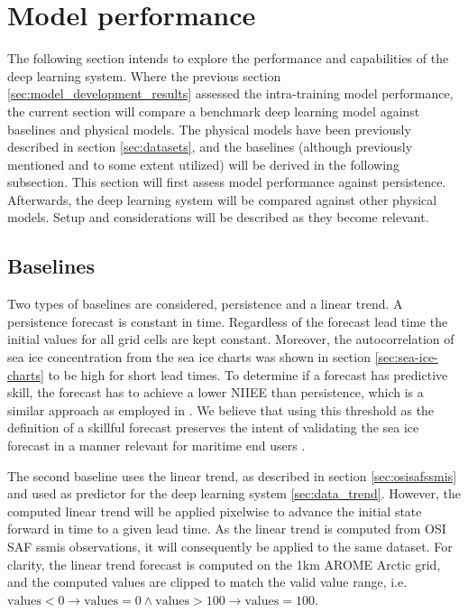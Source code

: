\documentclass[../main/thesis.tex]{subfiles}
\begin{document}
\section{Model performance}
\label{sec:model-perf}
The following section intends to explore the performance and capabilities of the deep learning system. Where the previous section \ref{sec:model_development_results} assessed the intra-training model performance, the current section will compare a benchmark deep learning model against baselines and physical models. The physical models have been previously described in section \ref{sec:datasets}, and the baselines (although previously mentioned and to some extent utilized) will be derived in the following subsection. This section will first assess model performance against persistence. Afterwards, the deep learning system will be compared against other physical models. Setup and considerations will be described as they become relevant.

\subsection{Baselines}
\label{sec:baselines}
Two types of baselines are considered, persistence and a linear trend. A persistence forecast is constant in time. Regardless of the forecast lead time the initial values for all grid cells are kept constant. Moreover, the autocorrelation of sea ice concentration from the sea ice charts was shown in section \ref{sec:sea-ice-charts} to be high for short lead times. To determine if a forecast has predictive skill, the forecast has to achieve a lower NIIEE than persistence, which is a similar approach as employed in \citet{Zampieri2019}. We believe that using this threshold as the definition of a skillful forecast preserves the intent of validating the sea ice forecast in a manner relevant for maritime end users \citep{Melsom2019, Veland2021}.

The second baseline uses the linear trend, as described in section \ref{sec:osisafssmis} and used as predictor for the deep learning system \ref{sec:data_trend}. However, the computed linear trend will be applied pixelwise to advance the initial state forward in time to a given lead time. As the linear trend is computed from OSI SAF ssmis observations, it will consequently be applied to the same dataset. For clarity, the linear trend forecast is computed on the 1km AROME Arctic grid, and the computed values are clipped to match the valid value range, i.e. $\text{values} < 0 \rightarrow \text{values} = 0 \land \text{values} > 100 \rightarrow \text{values} = 100$.
\end{document}

